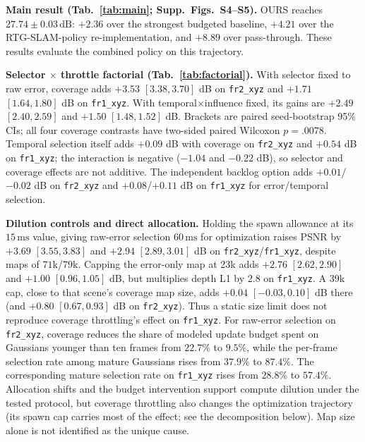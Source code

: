 \textbf{Main result (Tab.~\ref{tab:main}; Supp.\ Figs.~S4--S5).}
OURS reaches $27.74 \pm 0.03\,\mathrm{dB}$: $+2.36$ over the strongest budgeted baseline, $+4.21$ over the RTG-SLAM-policy re-implementation, and $+8.89$ over pass-through. These results evaluate the combined policy on this trajectory.

\textbf{Selector $\times$ throttle factorial (Tab.~\ref{tab:factorial}).}
With selector fixed to raw error, coverage adds $+3.53$ $[3.38,3.70]$ dB on \texttt{fr2\_xyz} and $+1.71$ $[1.64,1.80]$ dB on \texttt{fr1\_xyz}. With temporal$\times$influence fixed, its gains are $+2.49$ $[2.40,2.59]$ and $+1.50$ $[1.48,1.52]$ dB. Brackets are paired seed-bootstrap 95\% CIs; all four coverage contrasts have two-sided paired Wilcoxon $p=.0078$. Temporal selection itself adds $+0.09$ dB with coverage on \texttt{fr2\_xyz} and $+0.54$ dB on \texttt{fr1\_xyz}; the interaction is negative ($-1.04$ and $-0.22$ dB), so selector and coverage effects are not additive. The independent backlog option adds $+0.01$/$-0.02$ dB on \texttt{fr2\_xyz} and $+0.08$/$+0.11$ dB on \texttt{fr1\_xyz} for error/temporal selection.

\textbf{Dilution controls and direct allocation.}
Holding the spawn allowance at its $15\,\mathrm{ms}$ value, giving raw-error selection $60\,\mathrm{ms}$ for optimization raises PSNR by $+3.69$ $[3.55,3.83]$ and $+2.94$ $[2.89,3.01]$ dB on \texttt{fr2\_xyz}/\texttt{fr1\_xyz}, despite maps of $71\mathrm{k}$/$79\mathrm{k}$. Capping the error-only map at 23k adds $+2.76$ $[2.62,2.90]$ and $+1.00$ $[0.96,1.05]$ dB, but multiplies depth L1 by $2.8$ on \texttt{fr1\_xyz}. A 39k cap, close to that scene's coverage map size, adds $+0.04$ $[-0.03,0.10]$ dB there (and $+0.80$ $[0.67,0.93]$ dB on \texttt{fr2\_xyz}). Thus a static size limit does not reproduce coverage throttling's effect on \texttt{fr1\_xyz}. For raw-error selection on \texttt{fr2\_xyz}, coverage reduces the share of modeled update budget spent on Gaussians younger than ten frames from $22.7\%$ to $9.5\%$, while the per-frame selection rate among mature Gaussians rises from $37.9\%$ to $87.4\%$. The corresponding mature selection rate on \texttt{fr1\_xyz} rises from $28.8\%$ to $57.4\%$. Allocation shifts and the budget intervention support compute dilution under the tested protocol, but coverage throttling also changes the optimization trajectory (its spawn cap carries most of the effect; see the decomposition below). Map size alone is not identified as the unique cause.
